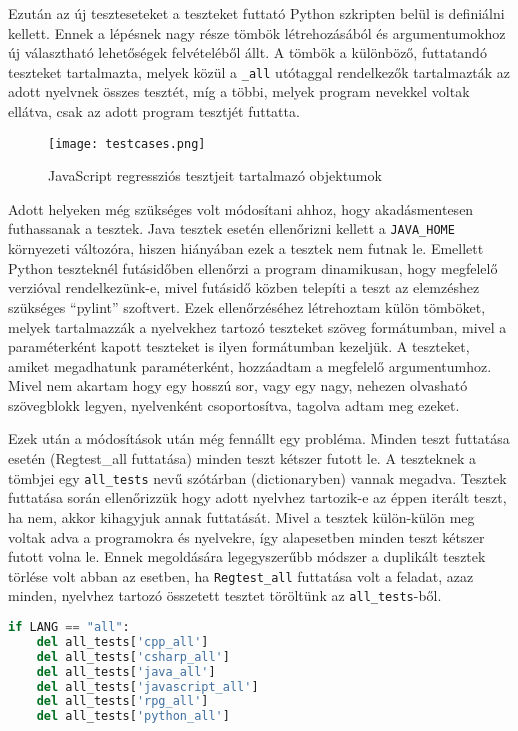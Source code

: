 Ezután az új teszteseteket a teszteket futtató Python szkripten belül is definiálni kellett.
Ennek a lépésnek nagy része tömbök létrehozásából és argumentumokhoz új választható lehetőségek felvételéből állt. A tömbök a különböző, futtatandó teszteket tartalmazta, melyek közül a \texttt{\_all} utótaggal rendelkezők tartalmazták az adott nyelvnek összes tesztét, míg a többi, melyek program nevekkel voltak ellátva, csak az adott program tesztjét futtatta.

\begin{figure}[!htbp]
    \caption{JavaScript regressziós tesztjeit tartalmazó objektumok}\label{fig:testcases}
    \centering
    \texttt{[image: testcases.png]}
\end{figure}

Adott helyeken még szükséges volt módosítani ahhoz, hogy akadásmentesen futhassanak a tesztek. Java tesztek esetén ellenőrizni kellett a \texttt{JAVA\_HOME} környezeti változóra, hiszen hiányában ezek a tesztek nem futnak le. Emellett Python teszteknél futásidőben ellenőrzi a program dinamikusan, hogy megfelelő verzióval rendelkezünk-e, mivel futásidő közben telepíti a teszt az elemzéshez szükséges ``pylint'' szoftvert.
Ezek ellenőrzéséhez létrehoztam külön tömböket, melyek tartalmazzák a nyelvekhez tartozó teszteket szöveg formátumban, mivel a paraméterként kapott teszteket is ilyen formátumban kezeljük.
A teszteket, amiket megadhatunk paraméterként, hozzáadtam a megfelelő argumentumhoz. Mivel nem akartam hogy egy hosszú sor, vagy egy nagy, nehezen olvasható szövegblokk legyen, nyelvenként csoportosítva, tagolva adtam meg ezeket.

Ezek után a módosítások után még fennállt egy probléma. Minden teszt futtatása esetén (Regtest\_all futtatása) minden teszt kétszer futott le. A teszteknek a tömbjei egy \texttt{all\_tests} nevű szótárban (dictionaryben) vannak megadva. Tesztek futtatása során ellenőrizzük hogy adott nyelvhez tartozik-e az éppen iterált teszt, ha nem, akkor kihagyjuk annak futtatását. Mivel a tesztek külön-külön meg voltak adva a programokra és nyelvekre, így alapesetben minden teszt kétszer futott volna le. Ennek megoldására legegyszerűbb módszer a duplikált tesztek törlése volt abban az esetben, ha \texttt{Regtest\_all} futtatása volt a feladat, azaz minden, nyelvhez tartozó összetett tesztet töröltünk az \texttt{all\_tests}-ből. 


\begin{lstlisting}[caption={CMake célpontok JavaScript teszteléshez},label={lst:abs-computedfiltering}, language={Python}]
if LANG == "all":
    del all_tests['cpp_all']
    del all_tests['csharp_all']
    del all_tests['java_all']
    del all_tests['javascript_all']
    del all_tests['rpg_all']
    del all_tests['python_all']
\end{lstlisting}